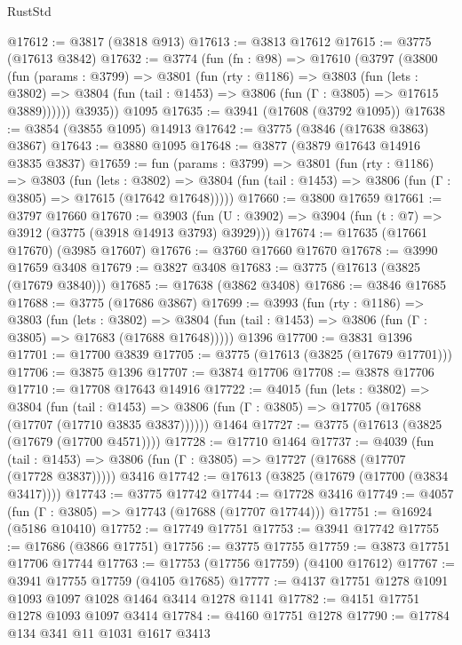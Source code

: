 \begin{lexlean}{RustStd}
\begin{coremodule}
{\begin{coremodule}
{{{{{{{{{{{{{{{{{{{{{{{{{{{{{{{@17612 := @3817 (@3818 @913)
@17613 := @3813 @17612
@17615 := @3775 (@17613 @3842)
@17632 := @3774
    (fun (fn : @98) =>
    @17610
      (@3797
        (@3800
          (fun (params : @3799) =>
          @3801
            (fun (rty : @1186) =>
            @3803
              (fun (lets : @3802) =>
              @3804 (fun (tail : @1453) => @3806 (fun (Γ : @3805) => @17615 @3889))))))
        @3935))
    @1095
@17635 := @3941 (@17608 (@3792 @1095))
@17638 := @3854 (@3855 @1095) @14913
@17642 := @3775 (@3846 (@17638 @3863) @3867)
@17643 := @3880 @1095
@17648 := @3877 (@3879 @17643 @14916 @3835 @3837)
@17659 := fun (params : @3799) =>
  @3801
    (fun (rty : @1186) =>
    @3803
      (fun (lets : @3802) =>
      @3804 (fun (tail : @1453) => @3806 (fun (Γ : @3805) => @17615 (@17642 @17648)))))
@17660 := @3800 @17659
@17661 := @3797 @17660
@17670 := @3903
    (fun (U : @3902) => @3904 (fun (t : @7) => @3912 (@3775 (@3918 @14913 @3793) @3929)))
@17674 := @17635 (@17661 @17670) (@3985 @17607)
@17676 := @3760 @17660 @17670
@17678 := @3990 @17659 @3408
@17679 := @3827 @3408
@17683 := @3775 (@17613 (@3825 (@17679 @3840)))
@17685 := @17638 (@3862 @3408)
@17686 := @3846 @17685
@17688 := @3775 (@17686 @3867)
@17699 := @3993
    (fun (rty : @1186) =>
    @3803
      (fun (lets : @3802) =>
      @3804 (fun (tail : @1453) => @3806 (fun (Γ : @3805) => @17683 (@17688 @17648)))))
    @1396
@17700 := @3831 @1396
@17701 := @17700 @3839
@17705 := @3775 (@17613 (@3825 (@17679 @17701)))
@17706 := @3875 @1396
@17707 := @3874 @17706
@17708 := @3878 @17706
@17710 := @17708 @17643 @14916
@17722 := @4015
    (fun (lets : @3802) =>
    @3804
      (fun (tail : @1453) =>
      @3806 (fun (Γ : @3805) => @17705 (@17688 (@17707 (@17710 @3835 @3837))))))
    @1464
@17727 := @3775 (@17613 (@3825 (@17679 (@17700 @4571))))
@17728 := @17710 @1464
@17737 := @4039
    (fun (tail : @1453) => @3806 (fun (Γ : @3805) => @17727 (@17688 (@17707 (@17728 @3837)))))
    @3416
@17742 := @17613 (@3825 (@17679 (@17700 (@3834 @3417))))
@17743 := @3775 @17742
@17744 := @17728 @3416
@17749 := @4057 (fun (Γ : @3805) => @17743 (@17688 (@17707 @17744)))
@17751 := @16924 (@5186 @10410)
@17752 := @17749 @17751
@17753 := @3941 @17742
@17755 := @17686 (@3866 @17751)
@17756 := @3775 @17755
@17759 := @3873 @17751 @17706 @17744
@17763 := @17753 (@17756 @17759) (@4100 @17612)
@17767 := @3941 @17755 @17759 (@4105 @17685)
@17777 := @4137 @17751 @1278 @1091 @1093 @1097 @1028 @1464 @3414 @1278 @1141
@17782 := @4151 @17751 @1278 @1093 @1097 @3414
@17784 := @4160 @17751 @1278
@17790 := @17784 @134 @341 @11 @1031 @1617 @3413
}}}}}}}}}}}}}}}}}}}}}}}}}}}}}}}
\end{coremodule}}
\end{coremodule}
\end{lexlean}
